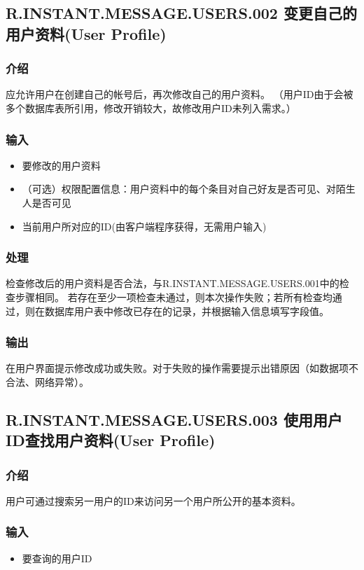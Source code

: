 \subsection{R.INSTANT.MESSAGE.USERS.002 变更自己的用户资料(User Profile)}
\subsubsection{介绍}
应允许用户在创建自己的帐号后，再次修改自己的用户资料。
（用户ID由于会被多个数据库表所引用，修改开销较大，故修改用户ID未列入需求。）

\subsubsection{输入}
\begin{itemize}
	\item 要修改的用户资料
	\item （可选）权限配置信息：用户资料中的每个条目对自己好友是否可见、对陌生人是否可见
	\item 当前用户所对应的ID(由客户端程序获得，无需用户输入)
	\end{itemize}

\subsubsection{处理}
检查修改后的用户资料是否合法，与R.INSTANT.MESSAGE.USERS.001中的检查步骤相同。
若存在至少一项检查未通过，则本次操作失败；若所有检查均通过，则在数据库用户表中修改已存在的记录，并根据输入信息填写字段值。
\subsubsection{输出}
在用户界面提示修改成功或失败。对于失败的操作需要提示出错原因（如数据项不合法、网络异常）。


\subsection{R.INSTANT.MESSAGE.USERS.003 使用用户ID查找用户资料(User Profile)}
\subsubsection{介绍}
用户可通过搜索另一用户的ID来访问另一个用户所公开的基本资料。
\subsubsection{输入}
\begin{itemize}
	\item 要查询的用户ID
	\end{itemize}
